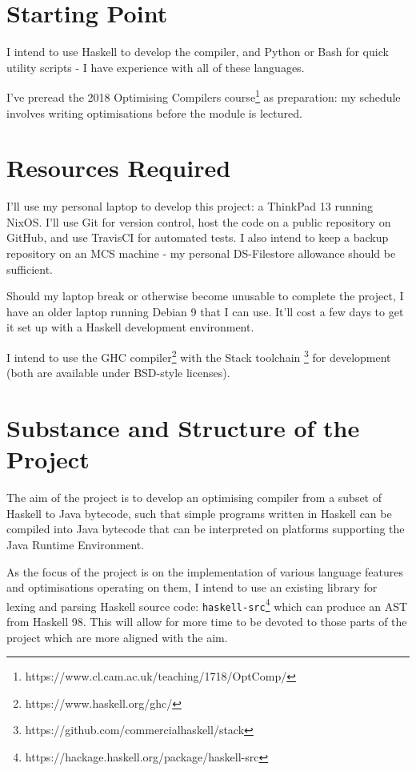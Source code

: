 \documentclass[12pt]{article}
\begin{document}
\section*{Starting Point}

I intend to use Haskell to develop the compiler, and Python or Bash for quick utility scripts - I have experience with
all of these languages.

I've preread the 2018 Optimising Compilers course\footnote{https://www.cl.cam.ac.uk/teaching/1718/OptComp/} as
preparation: my schedule involves writing optimisations before the module is lectured.


\section*{Resources Required}

I'll use my personal laptop to develop this project: a ThinkPad 13 running NixOS. I'll use Git for version control, host
the code on a public repository on GitHub, and use TravisCI for automated tests. I also intend to keep a backup
repository on an MCS machine - my personal DS-Filestore allowance should be sufficient.

Should my laptop break or otherwise become unusable to complete the project, I have an older laptop running Debian 9
that I can use. It'll cost a few days to get it set up with a Haskell development environment.

I intend to use the GHC compiler\footnote{https://www.haskell.org/ghc/} with the Stack toolchain
\footnote{https://github.com/commercialhaskell/stack} for development (both are available under BSD-style licenses).


\section*{Substance and Structure of the Project}

The aim of the project is to develop an optimising compiler from a subset of Haskell to Java bytecode, such that simple
programs written in Haskell can be compiled into Java bytecode that can be interpreted on platforms supporting the Java
Runtime Environment.

As the focus of the project is on the implementation of various language features and optimisations operating on them, I
intend to use an existing library for lexing and parsing Haskell source code:
\texttt{haskell-src}\footnote{https://hackage.haskell.org/package/haskell-src} which can produce an AST from
Haskell 98. This will allow for more time to be devoted to those parts of the project which are more aligned with the
aim.
\end{document}
